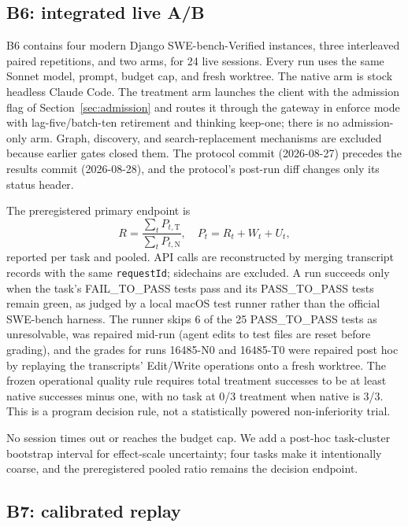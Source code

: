 \documentclass[10pt,twocolumn]{article}
\begin{document}
\subsection{B6: integrated live A/B}
\label{sec:b6method}

B6 contains four modern Django SWE-bench-Verified instances, three interleaved paired repetitions,
and two arms, for 24 live sessions.  Every run uses the same Sonnet model, prompt, budget cap, and fresh
worktree.  The native arm is stock headless Claude Code.  The treatment arm launches the client with
the admission flag of Section~\ref{sec:admission} and routes it through the gateway in enforce mode with
lag-five/batch-ten retirement and thinking keep-one; there is no admission-only arm.  Graph, discovery,
and search-replacement mechanisms are excluded because earlier gates closed them.  The protocol commit
(2026-08-27) precedes the results commit (2026-08-28), and the protocol's post-run diff changes only its
status header.

The preregistered primary endpoint is
\begin{equation}
R=\frac{\sum_t P_{t,\mathrm{T}}}{\sum_t P_{t,\mathrm{N}}},\quad
P_t=R_t+W_t+U_t,
\end{equation}
reported per task and pooled.  API calls are reconstructed by merging transcript records with the same
\texttt{requestId}; sidechains are excluded.  A run succeeds only when the task's FAIL\_TO\_PASS tests
pass and its PASS\_TO\_PASS tests remain green, as judged by a local macOS test runner rather than the
official SWE-bench harness.  The runner skips 6 of the 25 PASS\_TO\_PASS tests as unresolvable, was
repaired mid-run (agent edits to test files are reset before grading), and the grades for runs
16485-N0 and 16485-T0 were repaired post hoc by replaying the transcripts' Edit/Write operations onto
a fresh worktree.  The frozen operational quality rule requires total
treatment successes to be at least native successes minus one, with no task at 0/3 treatment when
native is 3/3.  This is a program decision rule, not a statistically powered non-inferiority trial.

No session times out or reaches the budget cap.  We add a post-hoc task-cluster bootstrap interval for
effect-scale uncertainty; four tasks make it intentionally coarse, and the preregistered pooled ratio
remains the decision endpoint.

\subsection{B7: calibrated replay}
\end{document}
